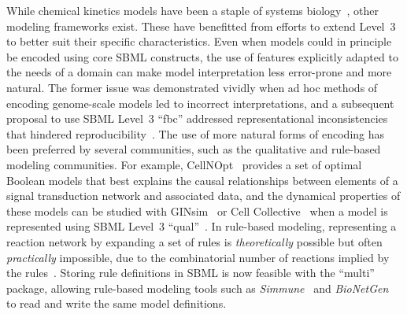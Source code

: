 \documentclass{sbml-paper}
\begin{document}
While chemical kinetics models have been a staple of systems biology~\citep{hubner2011applications}, other modeling frameworks exist.  These have benefitted from efforts to extend Level~3 to better suit their specific characteristics.  Even when models could in principle be encoded using core SBML constructs, the use of features explicitly adapted to the needs of a domain can make model interpretation less error-prone and more natural.  The former issue was demonstrated vividly when ad hoc methods of encoding genome-scale models led to incorrect interpretations, and a subsequent proposal to use SBML Level~3 ``fbc'' addressed representational inconsistencies that hindered reproducibility~\citep{Ebrahim2015}.  The use of more natural forms of encoding has been preferred by several communities, such as the qualitative and rule-based modeling communities.  For example, CellNOpt~\citep{terfve2012cellnoptr} provides a set of optimal Boolean models that best explains the causal relationships between elements of a signal transduction network and associated data, and the dynamical properties of these models can be studied with GINsim~\citep{chaouiya2012logical} or Cell Collective~\citep{helikar2012cell} when a model is represented using SBML Level~3 ``qual''~\citep{Chaouiya2015sbml}.  In rule-based modeling, representing a reaction network by expanding a set of rules is \emph{theoretically} possible but often \emph{practically} impossible, due to the combinatorial number of reactions implied by the rules~\citep{Hlavacek2003complexity}.  Storing rule definitions in SBML is now feasible with the ``multi'' package, allowing rule-based modeling tools such as \emph{Simmune}~\citep{zhang2013simmune} and \emph{BioNetGen}~\citep{faeder2009rule, Harris2016bionetgen} to read and write the same model definitions.  %
\end{document}
